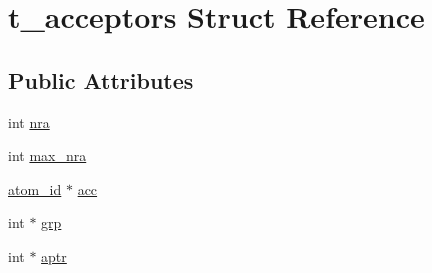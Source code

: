 \hypertarget{structt__acceptors}{\section{t\-\_\-acceptors \-Struct \-Reference}
\label{structt__acceptors}
}
\subsection*{\-Public \-Attributes}
\begin{DoxyCompactItemize}
\item 
int \hyperlink{structt__acceptors_aa700a6bad469756e89f82ba39fa171cb}{nra}
\item 
int \hyperlink{structt__acceptors_af8ea1c91a8932392c4589dddc3f7f145}{max\-\_\-nra}
\item 
\hyperlink{include_2types_2simple_8h_ad3f47cdb48677e516e2049719612c737}{atom\-\_\-id} $\ast$ \hyperlink{structt__acceptors_a300ca21ac37b9164a73bd0453d2040df}{acc}
\item 
int $\ast$ \hyperlink{structt__acceptors_aea20b28ad9770d062a72a01a40022768}{grp}
\item 
int $\ast$ \hyperlink{structt__acceptors_a1c8f13bd940a7aee4325931628f88a44}{aptr}
\end{DoxyCompactItemize}


